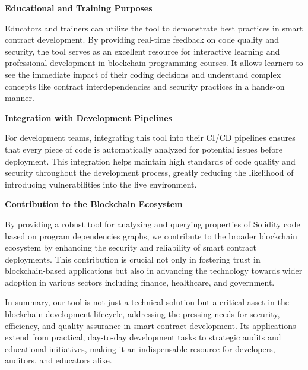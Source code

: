 {        \textbf{Educational and Training Purposes}

        Educators and trainers can utilize the tool to demonstrate best practices in smart contract development.
        By providing real-time feedback on code quality and security, the tool serves as an excellent resource for
        interactive learning and professional development in blockchain programming courses.
        It allows learners to see the immediate impact of their coding decisions and understand complex concepts
        like contract interdependencies and security practices in a hands-on manner.

        \textbf{ Integration with Development Pipelines}

        For development teams, integrating this tool into their CI/CD pipelines ensures that every piece of code is
        automatically analyzed for potential issues before deployment. This integration helps maintain high standards
        of code quality and security throughout the development process, greatly reducing the likelihood
        of introducing vulnerabilities into the live environment.

        \textbf{Contribution to the Blockchain Ecosystem}

        By providing a robust tool for analyzing and querying properties of Solidity code based on program
        dependencies graphs, we contribute to the broader blockchain ecosystem by enhancing the security
        and reliability of smart contract deployments. This contribution is crucial not only in fostering trust
        in blockchain-based applications but also in advancing the technology towards wider adoption in
        various sectors including finance, healthcare, and government.

        In summary, our tool is not just a technical solution but a critical asset in the blockchain development lifecycle, addressing the pressing needs for security, efficiency, and quality assurance in smart contract development. Its applications extend from practical, day-to-day development tasks to strategic audits and educational initiatives, making it an indispensable resource for developers, auditors, and educators alike.
    }

